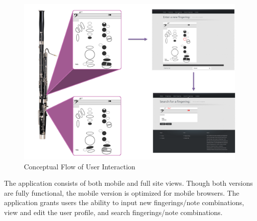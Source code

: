 \documentclass[12pt,english]{article}
\begin{document}
\begin{figure}[H]
\caption{Conceptual Flow of User Interaction}


\begin{centering}
\includegraphics[scale=0.15]{flow}
\par\end{centering}

\centering{}
\end{figure}


The application consists of both mobile and full site views. Though
both versions are fully functional, the mobile version is optimized
for mobile browsers. The application grants users the ability to input
new fingerings/note combinations, view and edit the user profile,
and search fingerings/note combinations.
\end{document}
